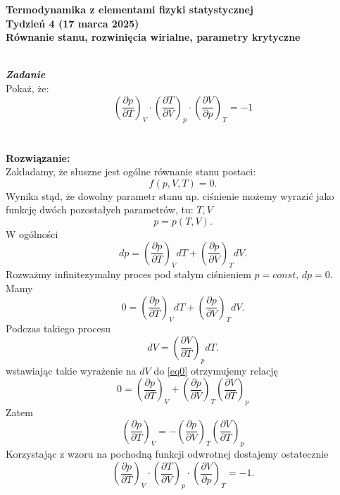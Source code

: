 \documentclass[11pt,a4paper]{article}
\newcounter{zadanie}\newcommand{\zadanie}[1][]{\addtocounter{zadanie}{1} ~\\  {\bf \emph{Zadanie \arabic{zadanie} #1 }} \\}
\newcommand{\Partial}[3]{\left( \frac{\partial #1}{\partial #2} \right)_{#3}}
\begin{document}

\begin{centering}
\bf{\Large{Termodynamika z elementami fizyki statystycznej}}\\
Tydzień 4  (17 marca 2025)\\[3mm]
Równanie stanu, rozwinięcia wirialne, parametry krytyczne \\ 
\end{centering} 
\vspace{5mm}

\zadanie
Pokaż, że: \[ 
\left(\frac{\partial p}{\partial T}\right)_V \cdot
\left(\frac{\partial T}{\partial V}\right)_p \cdot
\left(\frac{\partial V}{\partial p}\right)_T = -1 
\]
\\
\\
\textbf{Rozwiązanie:}
\\
Zakładamy, że słuszne jest ogólne równanie stanu postaci:
\begin{equation*}
    f(p,V,T)=0.
\end{equation*}
Wynika stąd, że dowolny parametr stanu np. ciśnienie możemy wyrazić jako funkcję dwóch pozostałych parametrów, tu: $T,V$
\begin{equation*}
    p=p(T,V).
\end{equation*}
W ogólności
\begin{equation*}
    dp = \Partial{p}{T}{V}dT+\Partial{p}{V}{T}dV.
\end{equation*}
Rozważmy infinitezymalny proces pod stałym ciśnieniem $p=const, \, dp=0$. Mamy
\begin{equation}
\label{eq0}
    0=\Partial{p}{T}{V}dT+\Partial{p}{V}{T}dV.
\end{equation}
Podczas takiego procesu
\begin{equation*}
    dV=\Partial{V}{T}{p}dT.
\end{equation*}
wstawiając takie wyrażenie na $dV$ do \eqref{eq0} otrzymujemy relację
\begin{equation*}
    0=\Partial{p}{T}{V}+\Partial{p}{V}{T}\Partial{V}{T}{p}
\end{equation*}
Zatem
\begin{equation*}
    \Partial{p}{T}{V}=-\Partial{p}{V}{T}\Partial{V}{T}{p}
\end{equation*}
Korzystając z wzoru na pochodną funkcji odwrotnej dostajemy ostatecznie
\[ 
\left(\frac{\partial p}{\partial T}\right)_V \cdot
\left(\frac{\partial T}{\partial V}\right)_p \cdot
\left(\frac{\partial V}{\partial p}\right)_T = -1.
\]
\end{document}
